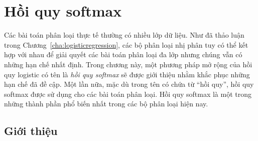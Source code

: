 \chapter{Hồi quy softmax}
\label{cha:softmax}
Các bài toán phân loại thực tế thường có nhiều lớp dữ liệu. Như đã thảo luận
trong Chương~\ref{cha:logisticregression}, các bộ phân loại nhị phân tuy có thể
kết hợp với nhau để giải quyết các bài toán phân loại đa lớp nhưng chúng vẫn có
những hạn chế nhất định. Trong chương này, một phương pháp mở rộng của hồi quy
logistic có tên là \textit{hồi quy softmax} sẽ được giới thiệu nhằm khắc phục
những hạn chế đã đề cập. Một lần nữa, mặc dù trong tên có chứa từ ``hồi quy'',
hồi quy softmax được sử dụng cho các bài toán phân loại. Hồi quy softmax là một
trong những thành phần phổ biến nhất trong các bộ phân loại hiện nay.


 
 
 
 
 
\section{Giới thiệu }

